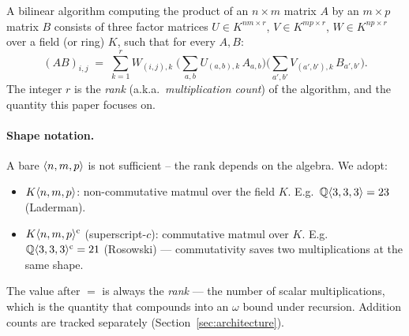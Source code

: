 
A bilinear algorithm computing the product of an \(n \times m\)
matrix \(A\) by an \(m \times p\) matrix \(B\) consists of three
factor matrices \(U \in K^{nm \times r}\), \(V \in K^{mp \times
r}\), \(W \in K^{np \times r}\) over a field (or ring) \(K\), such
that for every \(A, B\):
\[
  (AB)_{i,j} \;=\; \sum_{k=1}^{r}
  W_{(i,j),k}\;\Big(\sum_{a,b} U_{(a,b),k}\, A_{a,b}\Big)
  \Big(\sum_{a',b'} V_{(a',b'),k}\, B_{a',b'}\Big).
\]
The integer \(r\) is the \emph{rank} (a.k.a.\ \emph{multiplication
count}) of the algorithm, and the quantity this paper focuses on.

\paragraph{Shape notation.} A bare \(\langle n, m, p \rangle\) is not
sufficient -- the rank depends on the algebra. We adopt:
\begin{itemize}[itemsep=2pt]
  \item \(K\langle n, m, p \rangle\): non-commutative matmul over the
    field \(K\). E.g.\ \(\mathbb{Q}\langle 3, 3, 3 \rangle = 23\)
    (Laderman).
  \item \(K\langle n, m, p \rangle^{\mathrm{c}}\) (superscript-\(c\)): commutative
    matmul over \(K\). E.g.\ \(\mathbb{Q}\langle 3, 3, 3 \rangle^{\mathrm{c}} = 21\)
    (Rosowski) --- commutativity saves two multiplications at the same
    shape.
\end{itemize}
The value after \(=\) is always the \emph{rank} --- the number of
scalar multiplications, which is the quantity that compounds into an
\(\omega\) bound under recursion. Addition counts are tracked
separately (Section~\ref{sec:architecture}).

